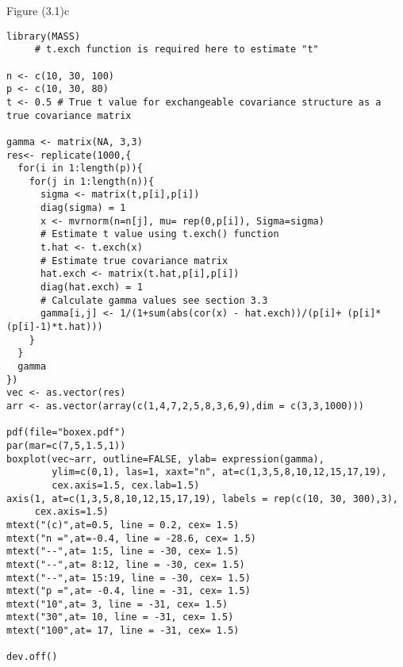 Figure (3.1)c
\begin{lstlisting}
library(MASS)
     # t.exch function is required here to estimate "t"

n <- c(10, 30, 100)
p <- c(10, 30, 80)
t <- 0.5 # True t value for exchangeable covariance structure as a true covariance matrix

gamma <- matrix(NA, 3,3)
res<- replicate(1000,{
  for(i in 1:length(p)){
    for(j in 1:length(n)){
      sigma <- matrix(t,p[i],p[i])
      diag(sigma) = 1
      x <- mvrnorm(n=n[j], mu= rep(0,p[i]), Sigma=sigma)
      # Estimate t value using t.exch() function
      t.hat <- t.exch(x)
      # Estimate true covariance matrix
      hat.exch <- matrix(t.hat,p[i],p[i])
      diag(hat.exch) = 1
      # Calculate gamma values see section 3.3
      gamma[i,j] <- 1/(1+sum(abs(cor(x) - hat.exch))/(p[i]+ (p[i]*(p[i]-1)*t.hat)))
    }
  }
  gamma
})
vec <- as.vector(res)
arr <- as.vector(array(c(1,4,7,2,5,8,3,6,9),dim = c(3,3,1000)))

pdf(file="boxex.pdf")
par(mar=c(7,5,1.5,1))
boxplot(vec~arr, outline=FALSE, ylab= expression(gamma),
        ylim=c(0,1), las=1, xaxt="n", at=c(1,3,5,8,10,12,15,17,19),
        cex.axis=1.5, cex.lab=1.5)
axis(1, at=c(1,3,5,8,10,12,15,17,19), labels = rep(c(10, 30, 300),3),
     cex.axis=1.5)
mtext("(c)",at=0.5, line = 0.2, cex= 1.5)
mtext("n =",at=-0.4, line = -28.6, cex= 1.5)
mtext("--",at= 1:5, line = -30, cex= 1.5)
mtext("--",at= 8:12, line = -30, cex= 1.5)
mtext("--",at= 15:19, line = -30, cex= 1.5)
mtext("p =",at= -0.4, line = -31, cex= 1.5)
mtext("10",at= 3, line = -31, cex= 1.5)
mtext("30",at= 10, line = -31, cex= 1.5)
mtext("100",at= 17, line = -31, cex= 1.5)

dev.off()
\end{lstlisting}

